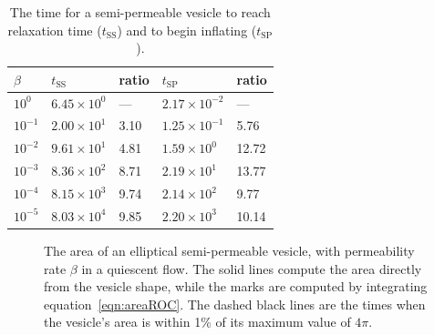 \documentclass[aps,prl,showpacs]{revtex4}
\newif\ifTikz
\begin{document}
\begin{table}[htp]
  \centering
  \begin{tabular}{|C{2cm}C{3cm}C{3cm}C{3cm}C{3cm}|}
    \hline
    $\beta$ & $t_\mathrm{SS}$ & ratio & $t_\mathrm{SP}$ & ratio \\
    \hline
    $10^{0}$  & $6.45 \times 10^{0}$ & ---  
              & $2.17 \times 10^{-2}$ & --- \\ 
    $10^{-1}$ & $2.00 \times 10^{1}$ & 3.10 & 
                $1.25 \times 10^{-1}$ & 5.76 \\
    $10^{-2}$ & $9.61 \times 10^{1}$ & 4.81 & 
                $1.59 \times 10^{0}$ & 12.72 \\
    $10^{-3}$ & $8.36 \times 10^{2}$ & 8.71 & 
                $2.19 \times 10^{1}$ & 13.77 \\
    $10^{-4}$ & $8.15 \times 10^{3}$ & 9.74 & 
                $2.14 \times 10^{2}$ & 9.77 \\
    $10^{-5}$ & $8.03 \times 10^{4}$ & 9.85 & 
                $2.20 \times 10^{3}$ & 10.14 \\
    \hline
  \end{tabular}
  \caption{\label{tbl:ellipseRelaxTimes} The time for a semi-permeable
  vesicle to reach relaxation time ($t_\mathrm{SS}$) and to begin
  inflating ($t_\mathrm{SP}$).}
\end{table}


\begin{figure}[htp]
\centering
\ifTikz

\fi
  \caption{\label{fig:ellipseArea} The area of an elliptical
  semi-permeable vesicle, with permeability rate $\beta$ in a quiescent
  flow. The solid lines compute the area directly from the vesicle
  shape, while the marks are computed by integrating
  equation~\eqref{eqn:areaROC}. The dashed black lines are the times
  when the vesicle's area is within 1\% of its maximum value of $4\pi$.}
\end{figure}
\end{document}
